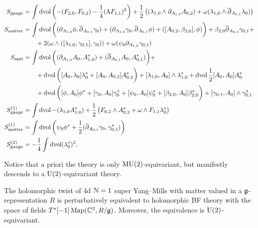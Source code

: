 \documentclass[10pt, oneside]{article}
\begin{document}
\begin{align*}
S_{\mathrm{gauge}} &= \int\operatorname{dvol}\left(-(F_{2, 0}, F_{0, 2}) - \frac{1}{4}(\Lambda F_{1, 1})^2\right) + \frac 12 \left((\lambda_{1,0} \wedge \partial_{A_{1,0}} A_{0,2}) + \omega (\lambda_{1,0} \wedge \overline{\partial}_{A_{0,1}} \lambda_0) \right)  \\
S_{\mathrm{matter}} &= \int \operatorname{dvol} \bigg((\partial_{A_{1,0}}\phi , \overline{\partial}_{A_{0,1}} \gamma_0) + (\partial_{A_{1,0}}\gamma_0, \overline{\partial}_{A_{0,1}} \phi) + ([A_{0,2}, \beta_{2,0}], \phi) \bigg) + \beta_{2,0} \overline{\partial}_{A_{0,1}} \gamma_{0,1}  + \\
&\qquad + 2 (\omega \wedge ([\lambda_{1,0}, \gamma_{0,1}] ,\gamma_{0})  ) + \omega (\psi_0 \partial_{A_{1,0}} \gamma_{0,1}) \\
S_{\mathrm{anti}} &= \int \operatorname{dvol} \bigg((\partial_{A_{1, 0}} A_0, A_{1,0}^*) + (\overline{\partial}_{A_{0, 1}} A_0, A_{0,1}^*) \bigg) +  \\
& \qquad + \operatorname{dvol} \bigg([A_0, \lambda_0] \lambda_0^* + [A_0, A_{0,2}] A_{0,2}^* \bigg) + [\lambda_{1,0}, A_0] \wedge \lambda_{1,0}^* + \operatorname{dvol} \frac{1}{2}[A_0, A_0]A_0^*\\ 
&\qquad  + \operatorname{dvol} \bigg( [\phi, A_0] \phi^* + [\gamma_0, A_0] \gamma_0^*  + [\psi_0, A_0] \psi_0^* + [\beta_{2,0}, A_0] \beta_{2,0}^* \bigg) + [\gamma_{0,1}, A_0]\wedge \gamma_{0,1}^*\\
S^{(1)}_{\mathrm{gauge}} &=  \int  \operatorname{dvol} - (\lambda_{1,0} A_{1,0}^*)  + \frac 12  \left(F_{0,2}\wedge A_{0,2}^*+ \omega\wedge F_{1,1} \lambda_0^*  \right) \\
S^{(1)}_{\mathrm{matter}} &=  \int  \operatorname{dvol} \left( \psi_0 \phi^* + \frac 12 ( \overline{\partial}_{A_{0,1}} \gamma_{0} , \gamma_{0,1}^*) \right)\\
S^{(2)}_{\mathrm{gauge}} &= -\frac{1}{4}\int \operatorname{dvol}(\lambda_0^*)^2.
\end{align*}

Notice that a priori the theory is only $\mathrm{MU}(2)$-equivariant, but manifestly descends to a $\mathrm{U}(2)$-equivariant theory. 

\begin{theorem} \label{4d_minimal_twist_thm}
The holomorphic twist of 4d $\mathcal N=1$ super Yang--Mills with matter valued in a $\mathfrak g$-representation $R$ is perturbatively equivalent to holomorphic BF theory with the space of fields $T^*[-1]\operatorname{Map}(\mathbb C^2, R/\mathfrak g)$. 
Moreover, the equivalence is $\mathrm{U}(2)$-equivariant.
\end{theorem}
\end{document}
